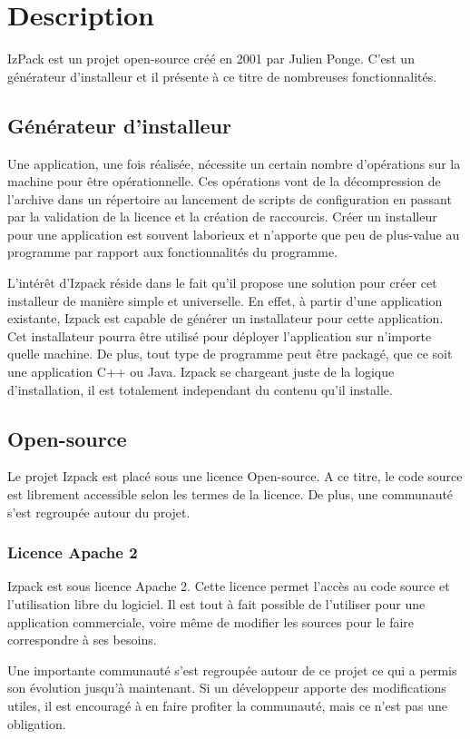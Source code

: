 \section{Description}
IzPack est un projet open-source créé en 2001 par Julien Ponge. C'est un générateur d'installeur et il présente à ce titre de nombreuses fonctionnalités.
\subsection{Générateur d'installeur}
Une application, une fois réalisée, nécessite un certain nombre d'opérations sur la machine pour être opérationnelle.
Ces opérations vont de la décompression de l'archive dans un répertoire au lancement de scripts de configuration en passant par la validation de la licence et la création de raccourcis.
Créer un installeur pour une application est souvent laborieux et n'apporte que peu de plus-value au programme par rapport aux fonctionnalités du programme.

L'intérêt d'Izpack réside dans le fait qu'il propose une solution pour créer cet installeur de manière simple et universelle.
En effet, à partir d'une application existante, Izpack est capable de générer un installateur pour cette application.
Cet installateur pourra être utilisé pour déployer l'application sur n'importe quelle machine.
De plus, tout type de programme peut être packagé, que ce soit une application C++ ou Java. Izpack se chargeant juste de la logique d'installation, il est totalement independant du contenu qu'il installe.
\subsection{Open-source}
Le projet Izpack est placé sous une licence Open-source. A ce titre, le code source est librement accessible selon les termes de la licence. De plus, une communauté s'est regroupée autour du projet.
\subsubsection{Licence Apache 2}
Izpack est sous licence Apache 2. Cette licence permet l'accès au code source et l'utilisation libre du logiciel.
Il est tout à fait possible de l'utiliser pour une application commerciale, voire même de modifier les sources pour le faire correspondre à ses besoins.

Une importante communauté s'est regroupée autour de ce projet ce qui a permis son évolution jusqu'à maintenant.
Si un développeur apporte des modifications utiles, il est encouragé à en faire profiter la communauté, mais ce n'est pas une obligation.
